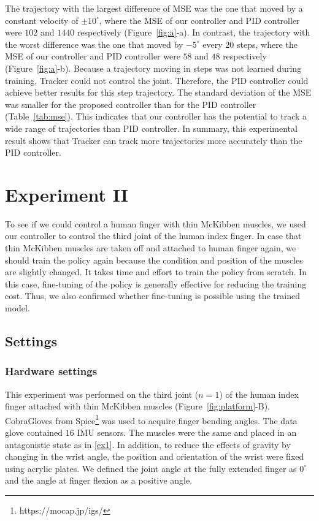 \documentclass[letterpaper, 10 pt, conference]{ieeeconf}  %
\newcommand{\figref}{Figure~\ref}
\newcommand{\tabref}{Table~\ref}
\begin{document}
The trajectory with the largest difference of MSE was the one that moved by a constant velocity of $\pm 10^\circ$, where the MSE of our controller and PID controller were $102$ and $1440$ respectively (\figref{fig:a}-a). In contrast, the trajectory with the worst difference was the one that moved by $-5^\circ$ every $20$ steps, where the MSE of our controller and PID controller were $58$ and $48$ respectively (\figref{fig:a}-b). 
Because a trajectory moving in steps was not learned during training, Tracker could not control the joint. Therefore, the PID controller could achieve better results for this step trajectory. 
The standard deviation of the MSE was smaller for the proposed controller than for the PID controller (\tabref{tab:mse}). This indicates that our controller has the potential to track a wide range of trajectories than PID controller. In summary, this experimental result shows that Tracker can track more trajectories more accurately than the PID controller.

\section{Experiment I\hspace{-1.2pt}I}
To see if we could control a human finger with thin McKibben muscles, we used our controller to control the third joint of the human index finger.
In case that thin McKibben muscles are taken off and attached to human finger again, we should train the policy again because the condition and position of the muscles are slightly changed. It takes time and effort to train the policy from scratch. In this case, fine-tuning of the policy is generally effective for reducing the training cost. Thus, we also confirmed whether fine-tuning is possible using the trained model.

\subsection{Settings}
\subsubsection{Hardware settings}
This experiment was performed on the third joint ($n=1$) of the human index finger attached with thin McKibben muscles (\figref{fig:platform}-B). CobraGloves from Spice\footnote{https://mocap.jp/igs/} was used to acquire finger bending angles.
The data glove contained $16$ IMU sensors. The muscles were the same and placed in an antagonistic state as in \ref{ex1}.
In addition, to reduce the effects of gravity by changing in the wrist angle, the position and orientation of the wrist were fixed using acrylic plates.
We defined the joint angle at the fully extended finger as $0^\circ$ and the angle at finger flexion as a positive angle.
\end{document}
